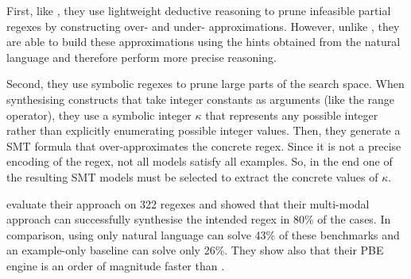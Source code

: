 First, like \AlphaRegex, they use lightweight deductive reasoning to prune infeasible partial regexes by constructing over- and under- approximations. However, unlike \AlphaRegex, they are able to build these approximations using the hints obtained from the natural language and therefore perform more precise reasoning.


Second, they use symbolic regexes to prune large parts of the search space.
When synthesising constructs that take integer constants as arguments (like the range operator), they use a symbolic integer \(\kappa\) that represents any possible integer rather than explicitly enumerating possible integer values.
Then, they generate a SMT formula that over-approximates the concrete regex. Since it is not a precise encoding of the regex, not all models satisfy all examples. So, in the end one of the resulting \ac{SMT} models must be selected to extract the concrete values of \(\kappa\).

\citeauthor{Regel20} evaluate their approach on 322 regexes and showed that their multi-modal approach can successfully synthesise the intended regex in 80\% of the cases. In comparison, using only natural language can solve 43\% of these benchmarks and an example-only baseline can solve only 26\%. 
%
They show also that their PBE engine is an order of magnitude faster than \AlphaRegex.